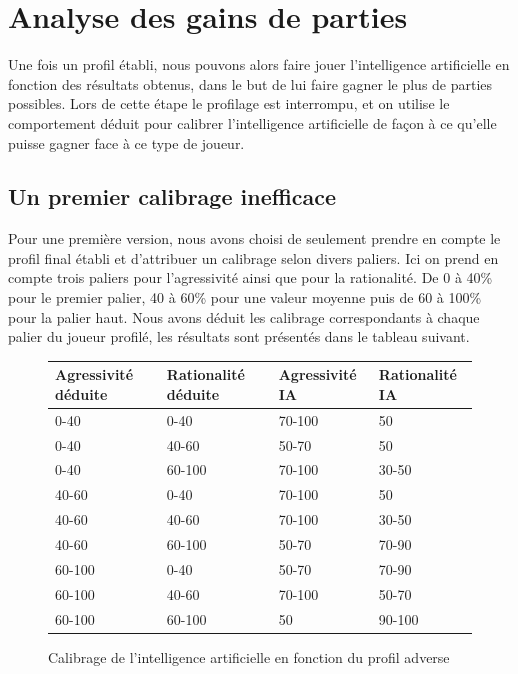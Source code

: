 \documentclass{report}
\begin{document}
\chapter{Analyse des gains de parties}

\hspace{0.5cm}Une fois un profil établi, nous pouvons alors faire jouer l'intelligence artificielle en fonction des résultats obtenus, dans le but de lui faire gagner le plus de parties possibles. Lors de cette étape le profilage est interrompu, et on utilise le comportement déduit pour calibrer l'intelligence artificielle de façon à ce qu'elle puisse gagner face à ce type de joueur.\par

\section{Un premier calibrage inefficace}

Pour une première version, nous avons choisi de seulement prendre en compte le profil final établi et d'attribuer un calibrage selon divers paliers. Ici on prend en compte trois paliers pour l'agressivité ainsi que pour la rationalité. De 0 à 40\% pour le premier palier, 40 à 60\% pour une valeur moyenne puis de 60 à 100\% pour la palier haut. Nous avons déduit les calibrage correspondants à chaque palier du joueur profilé, les résultats sont présentés dans le tableau suivant.\\
\begin{figure}[H]
\begin{center}
\begin{tabular}{|l|l|l|l|}
\hline
Agressivité déduite & Rationalité déduite &	Agressivité IA & 	Rationalité IA\\
\hline
0-40	 			    & 0-40 				 & 	70-100		   & 50\\
\hline
0-40					&	40-60			 &	50-70		   & 	50\\
\hline
0-40					& 60-100				 &	70-100		   &	30-50\\
\hline
40-60				&	0-40				 &	70-100		   &	50\\
\hline
40-60				&	40-60			&	70-100			&	30-50\\
\hline
40-60				&	60-100			&	50-70			&	70-90\\
\hline
60-100				&	0-40				&	50-70			&	70-90\\
\hline
60-100				&	40-60			&	70-100			&	50-70\\
\hline
60-100				&	60-100			&	50				&	90-100\\
\hline
\end{tabular}
\end{center}
\caption{Calibrage de l'intelligence artificielle en fonction du profil adverse}
\end{figure}
\end{document}
